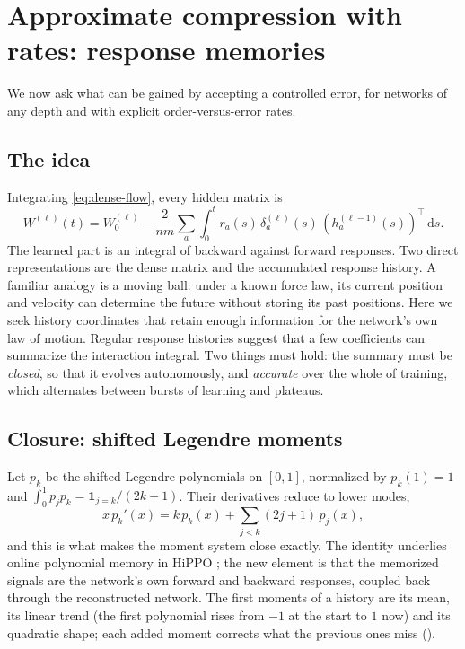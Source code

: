 \documentclass[11pt]{article}
\theoremstyle{definition}
\theoremstyle{remark}
\newcommand{\dd}{\,\mathrm{d}}
\begin{document}
\section{Approximate compression with rates: response memories}
\label{sec:memory}

We now ask what can be gained by accepting a controlled error, for networks of
any depth and with explicit order-versus-error rates.

\subsection{The idea}

Integrating \eqref{eq:dense-flow}, every hidden matrix is
\begin{equation}
 W^{(\ell)}(t)=W_0^{(\ell)}-\frac{2}{nm}\sum_a
 \int_0^t r_a(s)\,\delta_a^{(\ell)}(s)\,
 (h_a^{(\ell-1)}(s))^\top\dd s .                        \label{eq:exact-history}
\end{equation}
The learned part is an integral of backward against forward responses.  Two
direct representations are the dense matrix and the accumulated response
history.  A familiar analogy is a moving ball: under a known force law, its
current position and velocity can determine the future without storing its past
positions.  Here we seek history coordinates that retain enough information
for the network's own law of motion.  Regular response histories suggest that
a few coefficients can summarize the interaction integral.  Two things must
hold: the summary must be
\emph{closed}, so that it evolves autonomously, and \emph{accurate} over the
whole of training, which alternates between bursts of learning and plateaus.

\subsection{Closure: shifted Legendre moments}

Let $p_k$ be the shifted Legendre polynomials on $[0,1]$, normalized by
$p_k(1)=1$ and $\int_0^1p_jp_k=\mathbf 1_{j=k}/(2k+1)$.  Their derivatives reduce
to lower modes,
\begin{equation}
 x\,p_k'(x)=k\,p_k(x)+\sum_{j<k}(2j+1)\,p_j(x),        \label{eq:triangular}
\end{equation}
and this is what makes the moment system close exactly.  The identity underlies
online polynomial memory in HiPPO \citep{gu2020hippo}; the new element is that
the memorized signals are the network's own forward and backward responses,
coupled back through the reconstructed network.
The first moments of a history are its mean, its linear trend (the first
polynomial rises from $-1$ at the start to $1$ now) and its quadratic shape;
each added moment corrects what the previous ones miss ().
\end{document}

